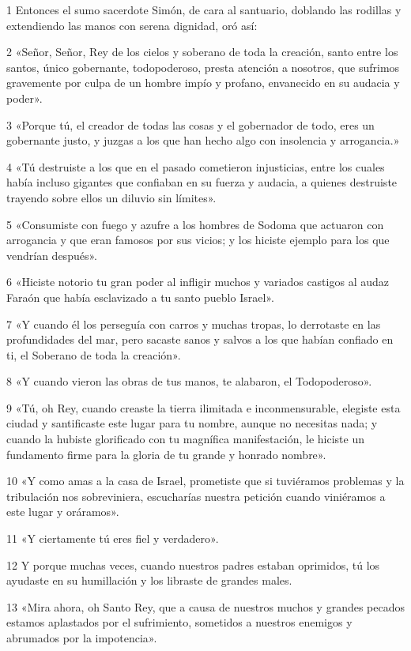 \par 1 Entonces el sumo sacerdote Simón, de cara al santuario, doblando las rodillas y extendiendo las manos con serena dignidad, oró así:
\par 2 «Señor, Señor, Rey de los cielos y soberano de toda la creación, santo entre los santos, único gobernante, todopoderoso, presta atención a nosotros, que sufrimos gravemente por culpa de un hombre impío y profano, envanecido en su audacia y poder».
\par 3 «Porque tú, el creador de todas las cosas y el gobernador de todo, eres un gobernante justo, y juzgas a los que han hecho algo con insolencia y arrogancia.»
\par 4 «Tú destruiste a los que en el pasado cometieron injusticias, entre los cuales había incluso gigantes que confiaban en su fuerza y ​​audacia, a quienes destruiste trayendo sobre ellos un diluvio sin límites».
\par 5 «Consumiste con fuego y azufre a los hombres de Sodoma que actuaron con arrogancia y que eran famosos por sus vicios; y los hiciste ejemplo para los que vendrían después».
\par 6 «Hiciste notorio tu gran poder al infligir muchos y variados castigos al audaz Faraón que había esclavizado a tu santo pueblo Israel».
\par 7 «Y cuando él los perseguía con carros y muchas tropas, lo derrotaste en las profundidades del mar, pero sacaste sanos y salvos a los que habían confiado en ti, el Soberano de toda la creación».
\par 8 «Y cuando vieron las obras de tus manos, te alabaron, el Todopoderoso».
\par 9 «Tú, oh Rey, cuando creaste la tierra ilimitada e inconmensurable, elegiste esta ciudad y santificaste este lugar para tu nombre, aunque no necesitas nada; y cuando la hubiste glorificado con tu magnífica manifestación, le hiciste un fundamento firme para la gloria de tu grande y honrado nombre».
\par 10 «Y como amas a la casa de Israel, prometiste que si tuviéramos problemas y la tribulación nos sobreviniera, escucharías nuestra petición cuando viniéramos a este lugar y oráramos».
\par 11 «Y ciertamente tú eres fiel y verdadero».
\par 12 Y porque muchas veces, cuando nuestros padres estaban oprimidos, tú los ayudaste en su humillación y los libraste de grandes males.
\par 13 «Mira ahora, oh Santo Rey, que a causa de nuestros muchos y grandes pecados estamos aplastados por el sufrimiento, sometidos a nuestros enemigos y abrumados por la impotencia».
